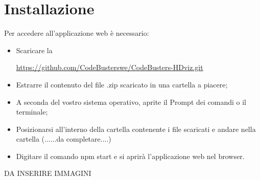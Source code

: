 \section{Installazione}
Per accedere all'applicazione web è necessario:
\begin{itemize}
	\item Scaricare la 
	\begin{center}
		\textcolor{blue}{\url{https://github.com/CodeBusterswe/CodeBusters-HDviz.git}}
	\end{center}
	
	\item Estrarre il contenuto del file .zip scaricato in una cartella a piacere;
	
	\item A seconda del vostro sistema operativo, aprite il Prompt dei comandi o il terminale;
	
	\item Posizionarsi all'interno della cartella contenente i file scaricati e andare nella cartella (......da completare....)
	
	\item Digitare il comando {\selectfont
npm start
} e si aprirà l'applicazione web nel browser.

	
\end{itemize}



DA INSERIRE IMMAGINI